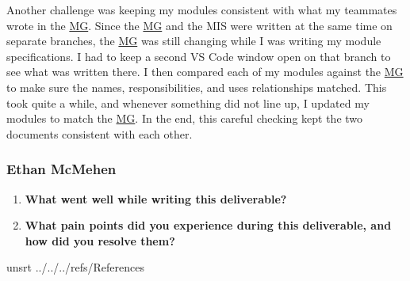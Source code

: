 \documentclass[10pt, titlepage]{article}
\newcommand{\mgurl}{https://github.com/team-hindsight/ophthamology-game/blob/main/pdfs/Design/SoftArchitecture/MG.pdf}
\newcommand{\mg}{\href{\mgurl}{MG}}
\begin{document}
\begin{enumerate}
    Another challenge was keeping my modules consistent with what my
    teammates wrote in the \mg{}. Since the \mg{} and the MIS were written at the
    same time on separate branches, the \mg{} was still changing while I was
    writing my module specifications. I had to keep a second VS Code
    window open on that branch to see what was written there. I then
    compared each of my modules against the \mg{} to make sure the names,
    responsibilities, and uses relationships matched. This took quite a
    while, and whenever something did not line up, I updated my modules to
    match the \mg{}. In the end, this careful checking kept the two documents
    consistent with each other.

\end{enumerate}

\subsubsection*{Ethan McMehen}

\begin{enumerate}
\item \textbf{What went well while writing this deliverable?}


\item \textbf{What pain points did you experience during this deliverable,
    and how did you resolve them?}

\end{enumerate}

\newpage
 {unsrt}
 {../../../refs/References}
\end{document}
